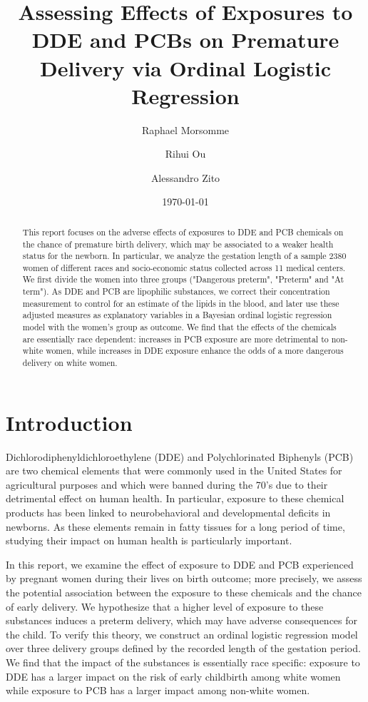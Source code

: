 \documentclass[10pt]{jmlr}%
\title[DDE and PCB effect on Premature delivery]{Assessing Effects of Exposures to DDE and PCBs on Premature Delivery via Ordinal Logistic Regression}	%
\author[Morsomme, Ou, Zito]{Raphael Morsomme \and Rihui Ou \and Alessandro Zito}
\date{\today} %
\begin{document}
\maketitle

\begin{abstract}
This report focuses on the adverse effects of exposures to DDE and PCB chemicals on the chance of premature birth delivery, which may be associated to a weaker health status for the newborn. In particular, we analyze the gestation length of a sample 2380 women of different races and socio-economic status collected across 11 medical centers. We first divide the women into three groups ("Dangerous preterm", "Preterm" and "At term"). As DDE and PCB are lipophilic substances, we correct their concentration measurement to control for an estimate of the lipids in the blood, and later use these adjusted measures as explanatory variables in a Bayesian ordinal logistic regression model with the women's group as outcome. We find that the effects of the chemicals are essentially race dependent: increases in PCB exposure are more detrimental to non-white women, while increases in DDE exposure enhance the odds of a more dangerous delivery on white women. 
\end{abstract}
\newpage
\section{Introduction}
\label{sec:intro}

Dichlorodiphenyldichloroethylene (DDE) and Polychlorinated Biphenyls (PCB) are two chemical elements that were commonly used in the United States for agricultural purposes and which were banned during the 70's due to their detrimental effect on human health. In particular, exposure to these chemical products has been linked to neurobehavioral and developmental deficits in newborns. As these elements remain in fatty tissues for a long period of time, studying their impact on human health is particularly important.

In this report, we examine the effect of exposure to DDE and PCB experienced by pregnant women during their lives on birth outcome; more precisely, we assess the potential association between the exposure to these chemicals and the chance of early delivery. We hypothesize that a higher level of exposure to these substances induces a preterm delivery, which may have adverse consequences for the child. To verify this theory, we construct an ordinal logistic regression model over three delivery groups defined by the recorded length of the gestation period.  We find that the impact of the substances is essentially race specific: exposure to DDE has a larger impact on the risk of early childbirth among white women while exposure to PCB has a larger impact among non-white women. 
\end{document}
